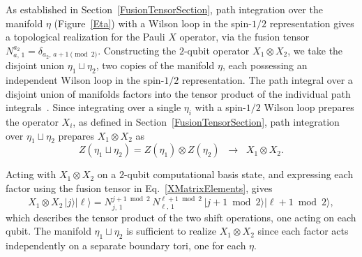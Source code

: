 \documentclass[12pt,a4paper]{article}
\def\ket#1{{|{#1}\rangle}}
\begin{document}
As established in Section~\ref{FusionTensorSection}, path integration over the manifold $\eta$ (Figure~\ref{Eta}) with a Wilson loop in the spin-$1/2$ representation gives a topological realization for the Pauli $X$ operator, via the fusion tensor $N^{a_2}_{a,\,1} = \delta_{a_2,\,a+1\pmod{2}}$. Constructing the $2$-qubit operator $X_1\otimes X_2$, we take the disjoint union $\eta_1 \sqcup \eta_2$, two copies of the manifold $\eta$, each possessing an independent Wilson loop in the spin-$1/2$ representation. The path integral over a disjoint union of manifolds factors into the tensor product of the individual path integrals~\cite{Atiyah1990,Salton:2016qpp}. Since integrating over a single $\eta_i$ with a spin-$1/2$ Wilson loop prepares the operator $X_i$, as defined in Section~\ref{FusionTensorSection}, path integration over $\eta_1 \sqcup \eta_2$ prepares $X_1\otimes X_2$ as
%
\begin{equation}\label{XXFactorization}
Z(\eta_1 \sqcup \eta_2) = Z(\eta_1) \otimes Z(\eta_2) \;\;\longrightarrow\;\; X_1 \otimes X_2.
\end{equation}
%

Acting with $X_1\otimes X_2$ on a $2$-qubit computational basis state, and expressing each factor using the fusion tensor in Eq.\ \eqref{XMatrixElements}, gives
%
\begin{equation}\label{XXConstruction}
X_1 \otimes X_2\,\ket{j}\ket{\ell} = N^{j+1\bmod 2}_{j,\,1}\,N^{\ell+1\bmod 2}_{\ell,\,1}\,\ket{j+1\bmod 2}\ket{\ell+1\bmod 2},
\end{equation}
%
which describes the tensor product of the two shift operations, one acting on each qubit. The manifold $\eta_1 \sqcup \eta_2$ is sufficient to realize $X_1\otimes X_2$ since each factor acts independently on a separate boundary tori, one for each $\eta$. 
\end{document}
